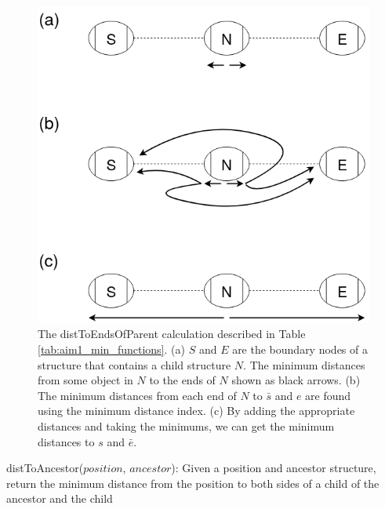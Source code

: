 \documentclass[11pt]{ucscthesis}
\begin{document}
\begin{figure}[H]
\centering
    \includegraphics[width=0.5\columnwidth]{aim1_distance_parent.png}
    \caption[Distance to ends of parent calculation]{
    The distToEndsOfParent calculation described in Table \ref{tab:aim1_min_functions}.
    (a) $S$ and $E$ are the boundary nodes of a structure that contains a child structure $N$. The minimum distances from some object in $N$ to the ends of $N$ shown as black arrows.
    (b) The minimum distances from each end of $N$ to $\bar{s}$ and $e$ are found using the minimum distance index.
    (c) By adding the appropriate distances and taking the minimums, we can get the minimum distances to $s$ and $\bar{e}$.
    }
    \label{fig:aim1_distance_parent}
\end{figure}


\begin{algorithm}[H]
    \caption[Algorithm for finding the distance from a position to the bounds of an ancestor snarl or chain]{distToAncestor($position$, $ancestor$): Given a position and ancestor structure, return the minimum distance from the position to both sides of a child of the ancestor and the child}
    \label{alg:aim1_dist_ancestsor}
\end{algorithm}
\end{document}
